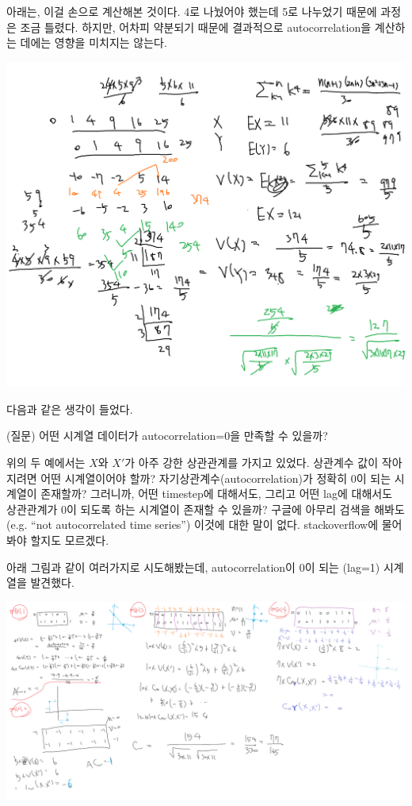 \documentclass{article}
\begin{document}
아래는, 이걸 손으로 계산해본 것이다.
4로 나눴어야 했는데 5로 나누었기 때문에 과정은 조금 틀렸다.
하지만, 어차피 약분되기 때문에 결과적으로 autocorrelation을 계산하는 데에는 영향을 미치지는 않는다.

\begin{center}
\includegraphics[width=.6\textwidth]{autocorrelation-1}
\end{center}

다음과 같은 생각이 들었다.

\begin{mdframed}
(질문) 어떤 시계열 데이터가 autocorrelation=0을 만족할 수 있을까?
\end{mdframed}

위의 두 예에서는 $X$와 $X'$가 아주 강한 상관관계를 가지고 있었다.
상관계수 값이 작아지려면 어떤 시계열이어야 할까?
자기상관계수(autocorrelation)가 정확히 0이 되는 시계열이 존재할까?
그러니까, 어떤 timestep에 대해서도, 그리고 어떤 lag에 대해서도 상관관계가 0이 되도록 하는 시계열이 존재할 수 있을까?
구글에 아무리 검색을 해봐도 (e.g. ``not autocorrelated time series'') 이것에 대한 말이 없다.
stackoverflow에 물어봐야 할지도 모르겠다.

아래 그림과 같이 여러가지로 시도해봤는데, autocorrelation이 0이 되는 (lag=1) 시계열을 발견했다.

\begin{center}
\includegraphics[width=\textwidth]{autocorrelation-2}
\end{center}
\end{document}
